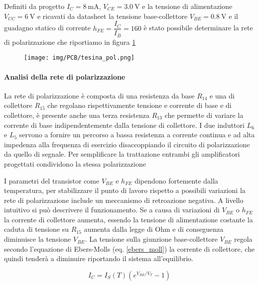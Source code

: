 \documentclass[12pt,oneside]{book}
\begin{document}
Definiti da progetto $I_{C}=\SI{8}{\milli\ampere}$, $V_{CE}=\SI{3.0}{\volt}$ e la tensione di alimentazione $V_{CC}=\SI{6}{\volt}$ e ricavati da datasheet la tensione base-collettore $V_{BE} = \SI{0.8}{\volt}$ e il guadagno statico di corrente $h_{FE} = \dfrac{I_C}{I_B}=160$ è stato possibile determinare la rete di polarizzazione che riportiamo in figura \ref{pol_net}

\begin{figure}[!htbp]
    \centering
        \texttt{[image: img/PCB/tesina\_pol.png]}
        \caption{}
        \label{pol_net}
    \hfill
\end{figure}

\paragraph{Analisi della rete di polarizzazione}
La rete di polarizzazione è composta di una resistenza da base $R_{14}$ e una di collettore $R_{15}$ che regolano rispettivamente tensione e corrente di base e di collettore, è presente anche una terza resistenza $R_{13}$ che permette di variare la corrente di base indipendentemente dalla tensione di collettore. I due induttori $L_6$ e $L_5$ servono a fornire un percorso a bassa resistenza a corrente continua e ad alta impedenza alla frequenza di esercizio disaccoppiando il circuito di polarizzazione da quello di segnale. Per semplificare la trattazione entrambi gli amplificatori progettati condividono la stessa polarizzazione

I parametri del transistor come $V_{BE}$ e $h_{FE}$ dipendono fortemente dalla temperatura, per stabilizzare il punto di lavoro rispetto a possibili variazioni la rete di polarizzazione include un meccanismo di retroazione negativa. A livello intuitivo si può descrivere il funzionamento. Se a causa di variazioni di $V_{BE}$ o $h_{FE}$ la corrente di collettore aumenta, essendo la tensione di alimentazione costante la caduta di tensione su $R_{15}$ aumenta dalla legge di Ohm e di conseguenza diminuisce la tensione $V_{BE}$. La tensione sulla giunzione base-collettore $V_{BE}$ regola secondo l'equazione di Ebers-Molls (eq. \eqref{ebers_moll}) la corrente di collettore, che quindi tenderà a diminuire riportando il sistema all'equilibrio.

\begin{equation}
    I_C=I_S(T)\left(e^{V_{BE}/V_T}-1\right)
    \label{ebers_moll}
\end{equation}

%
\end{document}
